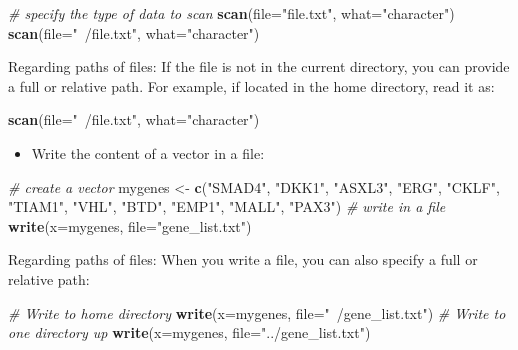 \documentclass[]{book}
\newenvironment{Shaded}{\begin{snugshade}}{\end{snugshade}}
\newcommand{\CommentTok}[1]{\textcolor[rgb]{0.56,0.35,0.01}{\textit{#1}}}
\newcommand{\DataTypeTok}[1]{\textcolor[rgb]{0.13,0.29,0.53}{#1}}
\newcommand{\KeywordTok}[1]{\textcolor[rgb]{0.13,0.29,0.53}{\textbf{#1}}}
\newcommand{\NormalTok}[1]{#1}
\newcommand{\StringTok}[1]{\textcolor[rgb]{0.31,0.60,0.02}{#1}}
\providecommand{\tightlist}{%
  \setlength{\itemsep}{0pt}\setlength{\parskip}{0pt}}
\begin{document}
\begin{Shaded}
\begin{Highlighting}[]
\CommentTok{# specify the type of data to scan}
\KeywordTok{scan}\NormalTok{(}\DataTypeTok{file=}\StringTok{"file.txt"}\NormalTok{, }
    \DataTypeTok{what=}\StringTok{"character"}\NormalTok{)}
\KeywordTok{scan}\NormalTok{(}\DataTypeTok{file=}\StringTok{"~/file.txt"}\NormalTok{, }
    \DataTypeTok{what=}\StringTok{"character"}\NormalTok{)}
\end{Highlighting}
\end{Shaded}

Regarding paths of files:
If the file is not in the current directory, you can provide a full or relative path. For example, if located in the home directory, read it as:

\begin{Shaded}
\begin{Highlighting}[]
\KeywordTok{scan}\NormalTok{(}\DataTypeTok{file=}\StringTok{"~/file.txt"}\NormalTok{, }
    \DataTypeTok{what=}\StringTok{"character"}\NormalTok{)}
\end{Highlighting}
\end{Shaded}

\begin{itemize}
\tightlist
\item
  Write the content of a vector in a file:
\end{itemize}

\begin{Shaded}
\begin{Highlighting}[]
\CommentTok{# create a vector}
\NormalTok{mygenes <-}\StringTok{ }\KeywordTok{c}\NormalTok{(}\StringTok{"SMAD4"}\NormalTok{, }\StringTok{"DKK1"}\NormalTok{, }\StringTok{"ASXL3"}\NormalTok{, }\StringTok{"ERG"}\NormalTok{, }\StringTok{"CKLF"}\NormalTok{, }\StringTok{"TIAM1"}\NormalTok{, }\StringTok{"VHL"}\NormalTok{, }\StringTok{"BTD"}\NormalTok{, }\StringTok{"EMP1"}\NormalTok{, }\StringTok{"MALL"}\NormalTok{, }\StringTok{"PAX3"}\NormalTok{)}
\CommentTok{# write in a file}
\KeywordTok{write}\NormalTok{(}\DataTypeTok{x=}\NormalTok{mygenes, }
    \DataTypeTok{file=}\StringTok{"gene_list.txt"}\NormalTok{)}
\end{Highlighting}
\end{Shaded}

Regarding paths of files:
When you write a file, you can also specify a full or relative path:

\begin{Shaded}
\begin{Highlighting}[]
\CommentTok{# Write to home directory}
\KeywordTok{write}\NormalTok{(}\DataTypeTok{x=}\NormalTok{mygenes,}
        \DataTypeTok{file=}\StringTok{"~/gene_list.txt"}\NormalTok{)}
\CommentTok{# Write to one directory up}
\KeywordTok{write}\NormalTok{(}\DataTypeTok{x=}\NormalTok{mygenes,}
        \DataTypeTok{file=}\StringTok{"../gene_list.txt"}\NormalTok{)}
\end{Highlighting}
\end{Shaded}
\end{document}
